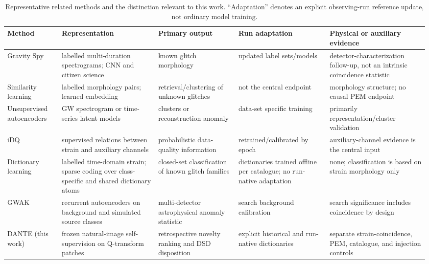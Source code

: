 \documentclass[12pt]{article}
\begin{document}
\begin{table}[t]
\centering
\caption{Representative related methods and the distinction relevant to this
work.  ``Adaptation'' denotes an explicit observing-run reference update, not
ordinary model training.}
\label{tab:related-work}
\scriptsize
\begingroup
\setlength{\tabcolsep}{3pt}
\renewcommand{\arraystretch}{1.08}
\begin{tabularx}{\textwidth}{@{}>{\raggedright\arraybackslash}p{}*{4}{>{\raggedright\arraybackslash}X}@{}}
\toprule
Method & Representation & Primary output & Run adaptation & Physical or auxiliary evidence \\
\midrule
Gravity Spy \cite{zevin2017,glanzer2023} & labelled multi-duration
spectrograms; CNN and citizen science & known glitch morphology & updated
label sets/models & detector-characterization follow-up, not an intrinsic
coincidence statistic \\
Similarity learning \cite{coughlin2019} & labelled morphology pairs; learned
embedding & retrieval/clustering of unknown glitches & not the central
endpoint & morphology structure; no causal PEM endpoint \\
Unsupervised autoencoders \cite{sakai2022,laguarta2023} & GW spectrogram or
time-series latent models & clusters or reconstruction anomaly & data-set
specific training & primarily representation/cluster validation \\
iDQ \cite{essick2020} & supervised relations between strain and auxiliary
channels & probabilistic data-quality information & retrained/calibrated by
epoch & auxiliary-channel evidence is the central input \\
Dictionary learning \cite{clawdia2025} & labelled time-domain strain; sparse
coding over class-specific and shared dictionary atoms & closed-set
classification of known glitch families & dictionaries trained offline per
catalogue; no run-native adaptation & none; classification is based on strain
morphology only \\
GWAK \cite{raikman2023} & recurrent autoencoders on background and simulated
source classes & multi-detector astrophysical anomaly statistic & search
background calibration & search significance includes coincidence by design \\
DANTE (this work) & frozen natural-image self-supervision on Q-transform
patches & retrospective novelty ranking and DSD disposition & explicit
historical and run-native dictionaries & separate strain-coincidence, PEM,
catalogue, and injection controls \\
\bottomrule
\end{tabularx}
\endgroup
\end{table}
\end{document}
